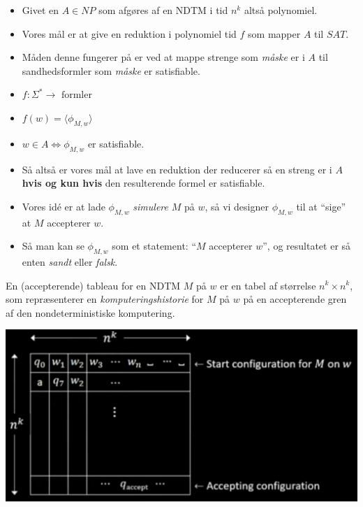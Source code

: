 \begin{frame}[allowframebreaks]
\begin{itemize}
	\item Givet en $A \in NP$ som afgøres af en NDTM i tid $n^{k}$ altså polynomiel.
	\item Vores mål er at give en reduktion i polynomiel tid $f$ som mapper $A$ til $SAT$.
	\item Måden denne fungerer på er ved at mappe strenge som \textit{måske} er i $A$ til sandhedsformler som \textit{måske} er satisfiable.
	\item $f : \Sigma^{*} \longrightarrow \text{ formler }$
	\item $f(w) = \langle \phi_{M,w} \rangle$
	\item $w \in A \iff \phi_{M,w}$ er satisfiable.
	\item Så altså er vores mål at lave en reduktion der reducerer så en streng er i $A$ \textbf{hvis og kun hvis} den resulterende formel er satisfiable.
	\item Vores idé er at lade $\phi_{M,w}$ \textit{simulere} $M$ på $w$, så vi designer \(\phi_{M,w}\) til at ``sige'' at $M$ accepterer $w$.
	\item Så man kan se \(\phi_{M,w}\) som et statement: ``$M$ accepterer $w$'', og resultatet er så enten \textit{sandt} eller \textit{falsk}.
  \end{itemize}

  \begin{definition}
En (accepterende) tableau for en NDTM $M$ på $w$ er en tabel af størrelse $n^{k} \times n^{k}$, som repræsenterer en \textit{komputeringshistorie} for $M$ på $w$ på en accepterende gren af den nondeterministiske komputering.
  \end{definition}
  \begin{center}
	\includegraphics[scale=0.45]{figur/video16b.png}
  \end{center}


\end{frame}
